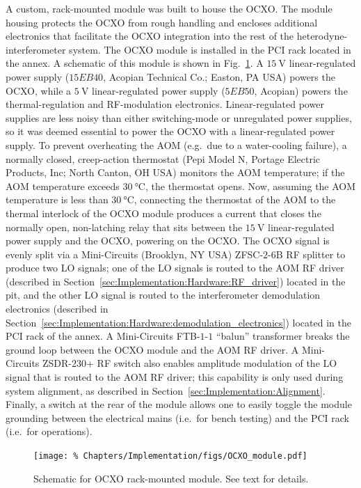 A custom, rack-mounted module was built to house the OCXO.
The module housing protects the OCXO from rough handling and
encloses additional electronics that facilitate
the OCXO integration into the rest of the heterodyne-interferometer system.
The OCXO module is installed in the PCI rack
located in the \diiid\space annex.
A schematic of this module is shown in
Fig.~\ref{fig:Implementation:OCXO_module}.
A $\SI{15}{\volt}$ linear-regulated power supply
($15EB40$, Acopian Technical Co.; Easton, PA USA)
powers the OCXO, while
a $\SI{5}{\volt}$ linear-regulated power supply ($5EB50$, Acopian)
powers the thermal-regulation and RF-modulation electronics.
Linear-regulated power supplies are less noisy than
either switching-mode or unregulated power supplies, so
it was deemed essential to power the OCXO
with a linear-regulated power supply.
To prevent overheating the AOM
(e.g.\ due to a water-cooling failure),
a normally closed, creep-action thermostat
(Pepi Model N, Portage Electric Products, Inc; North Canton, OH USA)
monitors the AOM temperature;
if the AOM temperature exceeds $\SI{30}{\celsius}$,
the thermostat opens.
Now, assuming the AOM temperature is less than $\SI{30}{\celsius}$,
connecting the thermostat of the AOM
to the thermal interlock of the OCXO module
produces a current that closes the normally open, non-latching relay
that sits between the $\SI{15}{\volt}$ linear-regulated power supply
and the OCXO, powering on the OCXO.
The OCXO signal is evenly split via
a Mini-Circuits (Brooklyn, NY USA) {ZFSC-$2$-$6$B} RF splitter
to produce two LO signals;
one of the LO signals is routed to the AOM RF driver
(described in Section~\ref{sec:Implementation:Hardware:RF_driver})
located in the \diiid\space pit, and
the other LO signal is routed to the interferometer demodulation electronics
(described in
Section~\ref{sec:Implementation:Hardware:demodulation_electronics})
located in the PCI rack of the \diiid\space annex.
A Mini-Circuits {FTB-$1$-$1$} ``balun'' transformer
breaks the ground loop between the OCXO module and the AOM RF driver.
A Mini-Circuits {ZSDR-$230$+} RF switch also enables amplitude modulation
of the LO signal that is routed to the AOM RF driver;
this capability is only used during system alignment, as described in
Section~\ref{sec:Implementation:Alignment}.
Finally, a switch at the rear of the module
allows one to easily toggle the module grounding between
the electrical mains (i.e.\ for bench testing) and
the PCI rack (i.e.\ for operations).

\begin{figure}
  \centering
  \texttt{[image: \%
    Chapters/Implementation/figs/OCXO\_module.pdf]}
  \caption[Schematic for OCXO rack-mounted module]{%
    Schematic for OCXO rack-mounted module. See text for details.}
  \label{fig:Implementation:OCXO_module}
\end{figure}


